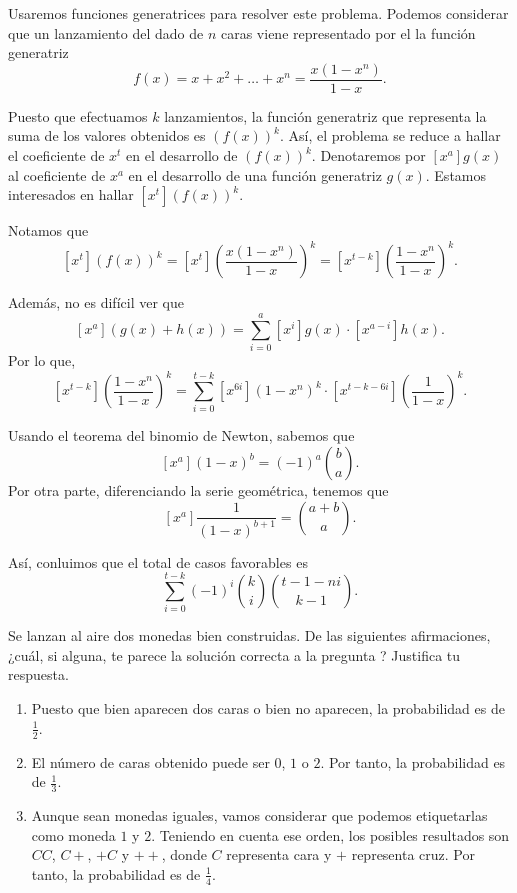 \begin{solution}
  Usaremos funciones generatrices para resolver este problema. Podemos
  considerar que un lanzamiento del dado de $n$ caras viene representado
  por el la función generatriz
  \[
    f(x) = x + x^2 + \dots + x^n = \frac{x(1 - x^n)}{1 - x}.
  \]

  Puesto que efectuamos $k$ lanzamientos, la función generatriz que
  representa la suma de los valores obtenidos es $(f(x))^k$. Así, el
  problema se reduce a hallar el coeficiente de $x^t$ en el desarrollo de
  $(f(x))^k$. Denotaremos por $[x^a]g(x)$ al coeficiente de $x^a$ en el
  desarrollo de una función generatriz $g(x)$. Estamos interesados en
  hallar $[x^t](f(x))^k$.

  Notamos que
  \[
    [x^t](f(x))^k = [x^t]\left(\frac{x(1 - x^n)}{1 - x}\right)^k
    = [x^{t - k}]\left(\frac{1 - x^n}{1 - x}\right)^k.
  \]

  Además, no es difícil ver que
  \[
    [x^a](g(x) + h(x)) = \sum_{i = 0}^{a} [x^i]g(x) \cdot [x^{a - i}]h(x).
  \]
  Por lo que,
  \[
    [x^{t - k}]\left(\frac{1 - x^n}{1 - x}\right)^k
    = \sum_{i = 0}^{t - k} [x^{6i}](1 - x^n)^k
    \cdot [x^{t - k - 6i}]\left(\frac{1}{1 - x}\right)^k.
  \]

  Usando el teorema del binomio de Newton, sabemos que
  \[
    [x^a] (1 - x)^b = (-1)^a \binom{b}{a}.
  \]
  Por otra parte, diferenciando la serie geométrica, tenemos que
  \[
    [x^a]\frac{1}{(1 - x)^{b + 1}} = \binom{a + b}{a}.
  \]

  Así, conluimos que el total de casos favorables es
  \[
    \sum_{i = 0}^{t - k} (-1)^i \binom{k}{i} \binom{t - 1 - ni}{k - 1}.
  \]
\end{solution}

\begin{exercise}
  Se lanzan al aire dos monedas bien construidas. De las siguientes
  afirmaciones, ¿cuál, si alguna, te parece la solución correcta a la
  pregunta ? Justifica tu respuesta.

  \begin{enumerate}
    \item Puesto que bien aparecen dos caras o bien no aparecen, la
    probabilidad es de $\frac{1}{2}$.
    \item El número de caras obtenido puede ser $0$, $1$ o $2$. Por tanto,
    la probabilidad es de $\frac{1}{3}$.
    \item Aunque sean monedas iguales, vamos considerar que podemos
    etiquetarlas como moneda $1$ y $2$. Teniendo en cuenta ese orden, los
    posibles resultados son $CC$, $C+$, $+C$ y $++$, donde $C$ representa
    cara y $+$ representa cruz. Por tanto, la probabilidad es de
    $\frac{1}{4}$.   
  \end{enumerate}
\end{exercise}

